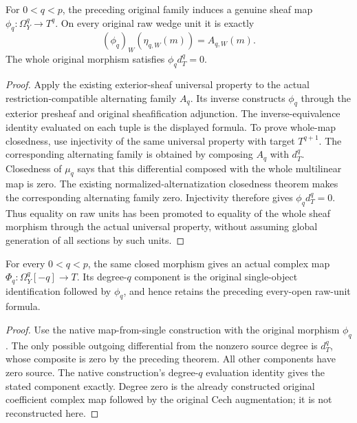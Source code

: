 \begin{theorem}
\label{thm:di-higher-exterior-sheaf-map}
\leanok
{}
For $0<q<p$, the preceding original family induces a genuine sheaf map
$\phi_q:\Omega_Y^q\to T^q$. On every original raw wedge unit it is exactly
\[
 (\phi_q)_W(\eta_{q,W}(m))=A_{q,W}(m).
\]
The whole original morphism satisfies $\phi_qd_T^q=0$.
\end{theorem}
\begin{proof}
\leanok
Apply the existing exterior-sheaf universal property to the actual
restriction-compatible alternating family $A_q$. Its inverse constructs
$\phi_q$ through the exterior presheaf and original sheafification
adjunction. The inverse-equivalence identity evaluated on each tuple is
the displayed formula. To prove whole-map closedness, use injectivity of
the same universal property with target $T^{q+1}$. The corresponding
alternating family is obtained by composing $A_q$ with $d_T^q$.
Closedness of $\mu_q$ says that this differential composed with the whole
multilinear map is zero. The existing normalized-alternatization
closedness theorem makes the corresponding alternating family zero.
Injectivity therefore gives $\phi_qd_T^q=0$. Thus equality on raw units
has been promoted to equality of the whole sheaf morphism through the
actual universal property, without assuming global generation of all
sections by such units.
\end{proof}

\begin{theorem}
\label{thm:di-higher-exterior-single-map}
\leanok
{}
For every $0<q<p$, the same closed morphism gives an actual complex map
$\Phi_q:\Omega_Y^q[-q]\to T$. Its degree-$q$ component is the original
single-object identification followed by $\phi_q$, and hence retains
the preceding every-open raw-unit formula.
\end{theorem}
\begin{proof}
\leanok
Use the native map-from-single construction with the original morphism
$\phi_q$. The only possible outgoing differential from the nonzero
source degree is $d_T^q$, whose composite is zero by the preceding
theorem. All other components have zero source. The native construction's
degree-$q$ evaluation identity gives the stated component exactly.
Degree zero is the already constructed original coefficient complex map
followed by the original Cech augmentation; it is not reconstructed here.
\end{proof}

